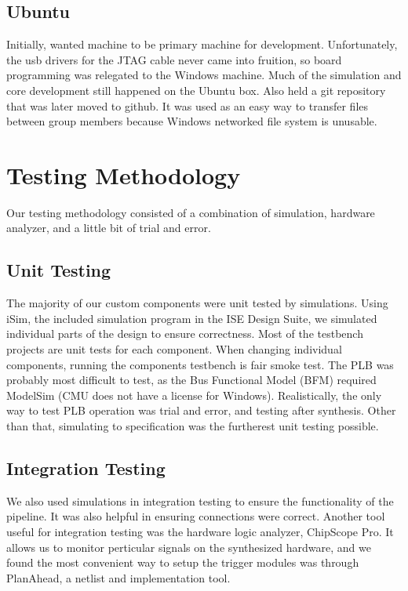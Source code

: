 \documentclass[letterpaper,10pt]{article}
\begin{document}
\subsection{Ubuntu}
Initially, wanted machine to be primary machine for development.  Unfortunately, the usb drivers for the JTAG cable never came into fruition, so board programming was relegated to the Windows machine.  Much of the simulation and core development still happened on the Ubuntu box.  Also held a git repository that was later moved to github.  It was used as an easy way to transfer files between group members because Windows networked file system is unusable.  

\section{Testing Methodology}
Our testing methodology consisted of a combination of simulation, hardware analyzer, and a little bit of trial and error.

\subsection{Unit Testing}
The majority of our custom components were unit tested by simulations. Using iSim, the included simulation program in the ISE Design Suite, we simulated individual parts of the design to ensure correctness.  Most of the testbench projects are unit tests for each component.  When changing individual components, running the components testbench is fair smoke test.  The PLB was probably most difficult to test, as the Bus Functional Model (BFM) required ModelSim (CMU does not have a license for Windows).  Realistically, the only way to test PLB operation was trial and error, and testing after synthesis.  Other than that, simulating to specification was the furtherest unit testing possible. 

\subsection{Integration Testing}
We also used simulations in integration testing to ensure the functionality of the pipeline.  It was also helpful in ensuring connections were correct.  Another tool useful for integration testing was the hardware logic analyzer, ChipScope Pro.  It allows us to monitor perticular signals on the synthesized hardware, and we found the most convenient way to setup the trigger modules was through PlanAhead, a netlist and implementation tool.  
\end{document}
